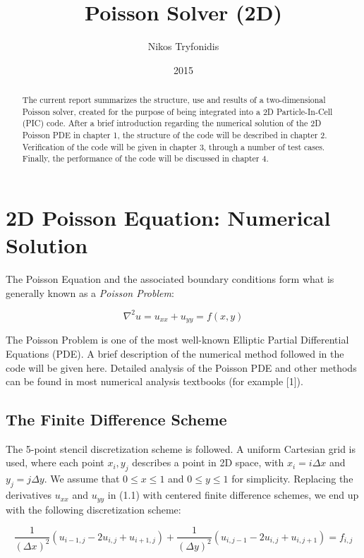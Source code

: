 \documentclass[11pt]{report}
\begin{document}
\title{Poisson Solver (2D)}
\author{Nikos Tryfonidis}
\date{2015}
\maketitle

\begin{abstract}
The current report summarizes the structure, use and results of a two-dimensional Poisson solver, 
created for the purpose of being integrated into a 2D Particle-In-Cell (PIC) code. After a brief introduction 
regarding the numerical solution of the 2D Poisson PDE in chapter 1, the structure of the code will be 
described in chapter 2. Verification of the code will be given in chapter 3, through a number of test cases. 
Finally, the performance of the code will be discussed in chapter 4.
\end{abstract}

\tableofcontents

\chapter{2D Poisson Equation: Numerical Solution}
The Poisson Equation and the associated boundary conditions form what is generally known as a 
\emph{Poisson Problem}: 

\begin{equation}
\nabla ^2 u = u_{xx} + u_{yy} = f(x,y)
\end{equation}

The Poisson Problem is one of the most well-known Elliptic Partial Differential Equations (PDE). A brief description of the numerical method followed in the code will be given here. Detailed analysis of the Poisson PDE and other methods can be found in most numerical analysis textbooks (for example [1]).

\section{The Finite Difference Scheme}
The 5-point stencil discretization scheme is followed. A uniform Cartesian grid is used, where each point $x_i, y_j$ describes a point in 2D space, with $x_i = i\Delta x$ and $y_j = j\Delta y$. We assume that $0 \leq x \leq 1$ and $0 \leq y \leq 1$ for simplicity. Replacing the derivatives $u_{xx}$ and $u_{yy}$ in (1.1) with centered finite difference schemes, we end up with the following discretization scheme:

\begin{equation}
\frac{1}{(\Delta x)^2}(u_{i-1,j} -2u_{i,j} + u_{i+1,j}) + 
\frac{1}{(\Delta y)^2}(u_{i,j-1} -2u_{i,j} + u_{i,j+1}) = f_{i,j}
\end{equation}
\end{document}
